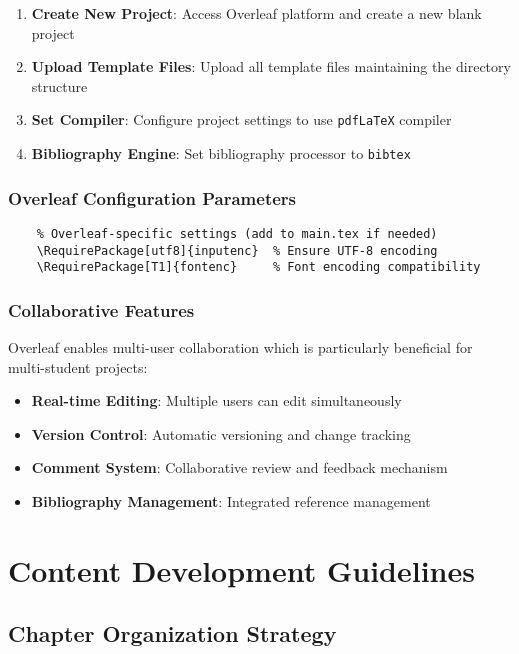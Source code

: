 \begin{enumerate}
	\item \textbf{Create New Project}: Access Overleaf platform and create a new blank project
	\item \textbf{Upload Template Files}: Upload all template files maintaining the directory structure
	\item \textbf{Set Compiler}: Configure project settings to use \texttt{pdfLaTeX} compiler
	\item \textbf{Bibliography Engine}: Set bibliography processor to \texttt{bibtex}
\end{enumerate}

\subsubsection{Overleaf Configuration Parameters}
\label{subsubsec:overleaf_config}

\begin{verbatim}
	% Overleaf-specific settings (add to main.tex if needed)
	\RequirePackage[utf8]{inputenc}  % Ensure UTF-8 encoding
	\RequirePackage[T1]{fontenc}     % Font encoding compatibility
\end{verbatim}

\subsubsection{Collaborative Features}
\label{subsubsec:collaborative}

Overleaf enables multi-user collaboration which is particularly beneficial for multi-student projects:

\begin{itemize}
	\item \textbf{Real-time Editing}: Multiple users can edit simultaneously
	\item \textbf{Version Control}: Automatic versioning and change tracking
	\item \textbf{Comment System}: Collaborative review and feedback mechanism
	\item \textbf{Bibliography Management}: Integrated reference management
\end{itemize}

\section{Content Development Guidelines}
\label{sec:content_development}

\subsection{Chapter Organization Strategy}
\label{subsec:chapter_organization}

